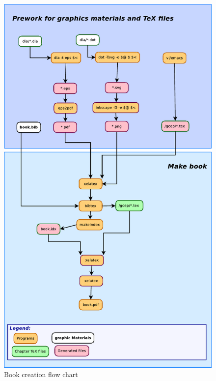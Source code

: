 \begin{figure}[H]
\caption{Book creation flow chart}
\label{bookmaking.dia}
\begin{center}
\includegraphics[scale=0.9]{dia/bookmaking.pdf}
\end{center}
\end{figure}


